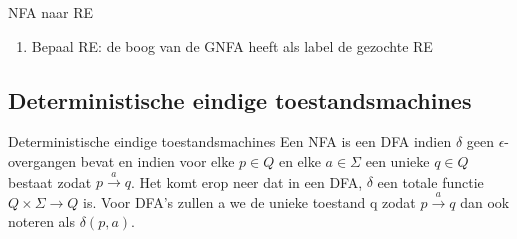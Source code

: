 \begin{alg}[NFA $\to$ RE]{NFA naar RE}
\begin{enumerate}
\begin{minipage}{.53\textwidth}
            \end{minipage}
        \item Bepaal RE: de boog van de GNFA heeft als label de gezochte RE
    \end{enumerate}
\end{alg}

\newpage

\subsection{Deterministische eindige toestandsmachines}

\vspace{0.5cm}

\begin{theo}{Deterministische eindige toestandsmachines}
    Een NFA is een DFA indien \(\delta\) geen \(\epsilon\)-overgangen bevat en 
    indien voor elke \(p \in Q\) en elke \(a \in \Sigma\) een unieke \(q \in Q\) 
    bestaat zodat \(p \overset{a}{\to} q\). Het komt erop neer dat in een DFA, \(\delta\) 
    een totale functie $Q \times \Sigma \to Q$ is. Voor DFA's zullen a
    we de unieke toestand q zodat \(p \overset{a}{\to} q\) dan ook noteren als \(\delta(p,a)\).
\end{theo}
